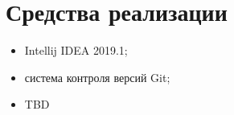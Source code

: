 \section{Средства реализации} \label{sub22}



\begin{itemize} 
\item{Intellij IDEA 2019.1;}	
\item{система контроля версий Git;}
\item{TBD}
\end{itemize}